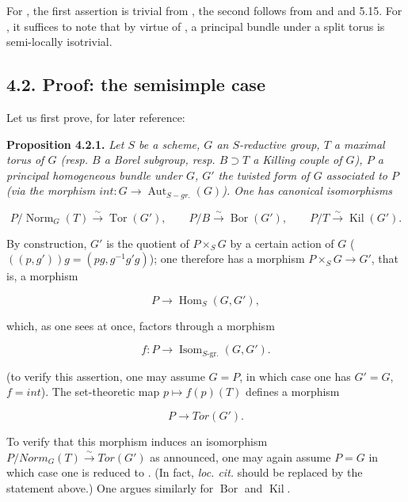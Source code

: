 For , the first assertion is trivial from , the second follows from  and  and 5.15. For , it
suffices to note that by virtue of , a principal bundle under a split torus is semi-locally isotrivial.

\subsection*{4.2. Proof: the semisimple case}

Let us first prove, for later reference:

\textbf{Proposition 4.2.1.} \emph{Let \(S\) be a scheme, \(G\) an \(S\)-reductive group, \(T\) a maximal torus of \(G\) (resp. \(B\) a Borel
subgroup, resp. \(B \supset T\) a Killing couple of \(G\)), \(P\) a principal homogeneous bundle under \(G\), \(G'\) the twisted
form of \(G\) associated to \(P\) (via the morphism \(int : G \to \operatorname{Aut}_{S-gr.}(G)\)). One has canonical
isomorphisms}

\[
  P/\operatorname{Norm}_G(T)\xrightarrow{\sim}\operatorname{Tor}(G'),
  \qquad
  P/B\xrightarrow{\sim}\operatorname{Bor}(G'),
  \qquad
  P/T\xrightarrow{\sim}\operatorname{Kil}(G').
\]

By construction, \(G'\) is the quotient of \(P \times_{S} G\) by a certain action of \(G\) (\(((p, g')) g = (pg, g^{-1} g'
g)\)); one therefore has a morphism \(P \times_{S} G \to G'\), that is, a morphism

\[ P \to \operatorname{Hom}_{S}(G, G'), \]

which, as one sees at once, factors through a morphism

\[
  f:P\longrightarrow\operatorname{Isom}_{S\text{-}\mathrm{gr.}}(G,G').
\]

(to verify this assertion, one may assume \(G = P\), in which case one has \(G' = G\), \(f = int\)). The set-theoretic map \(p
\mapsto f(p)(T)\) defines a morphism

\[ P \to Tor(G'). \]

To verify that this morphism induces an isomorphism \(P / Norm_{G}(T) \xrightarrow{\sim} Tor(G')\) as announced, one may
again assume \(P = G\) in which case one is reduced to . (In fact, \emph{loc. cit.} should be replaced by
the statement above.) One argues similarly for \(\operatorname{Bor}\) and \(\operatorname{Kil}\).

